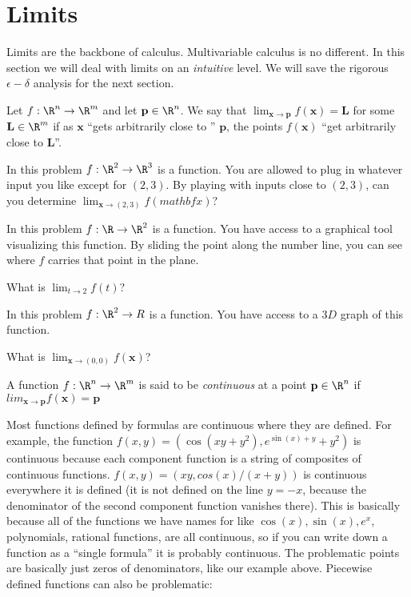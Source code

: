 
\section{Limits}
	Limits are the backbone of calculus.  Multivariable calculus is no different.  In this section we will deal with limits on an \textit{intuitive} level.  
	We will save the rigorous $\epsilon-\delta$ analysis for the next section.
	
	Let $f: \R^n \to \R^m$ and let $\mathbf{p} \in \R^n$.  We say that $\lim_{\mathbf{x} \to \mathbf{p}} f(\mathbf{x}) = \mathbf{L}$ for some $\mathbf{L} \in \R^m$ 
	if as $\mathbf{x}$ ``gets arbitrarily close to '' $\mathbf{p}$, the points $f(\mathbf{x})$ ``get arbitrarily close to $\mathbf{L}$''.  
	
	\begin{problem}
		In this problem $f:\R^2 \to \R^3$ is a function.  You are allowed to plug in whatever input you like except for $(2,3)$.   By playing with inputs close to $(2,3)$, can
		you determine
		$\lim_{\mathbf{x} \to (2,3)} f(mathbf{x})$?
	\end{problem}
	
	\begin{problem}
		In this problem $f: \R \to \R^2$ is a function.  You have access to a graphical tool visualizing this function.  By sliding the point along the number line, you can 
		see where $f$ carries that point in the plane.
		
		What is $\lim_{t \to 2} f(t)$?
	\end{problem}
	
	\begin{problem}
		In this problem $f:\R^2 \to R$ is a function.  You have access to a $3D$ graph of this function.  
		
		What is $\lim_{\mathbf{x} \to (0,0)} f(\mathbf{x})$?
	\end{problem}
	
	\begin{definition}
		A function $f: \R^n \to \R^m$ is said to be \textit{continuous} at a point $\mathbf{p} \in \R^n$ if $lim_{\mathbf{x} \to \mathbf{p}} f(\mathbf{x}) = \mathbf{p}$
	\end{definition}
	
	Most functions defined by formulas are continuous where they are defined.  For example, the function
	$f(x,y) = (\cos(xy+y^2),e^{\sin(x)+y}+y^2)$ is continuous because each component function is a string of composites of continuous functions. 
	$f(x,y) = (xy,cos(x)/(x+y))$ is continuous everywhere it is defined (it is not defined on the line $y=-x$, because the denominator of the 
	second component function vanishes there).  This is basically because all of the functions we have names for like $\cos(x),\sin(x), e^x$, polynomials, 
	rational functions, are all continuous, so if you can write down a function as a ``single formula'' it is probably continuous. 
	The problematic points are basically just zeros of denominators, like our example above.  Piecewise defined functions can also be problematic:
	
